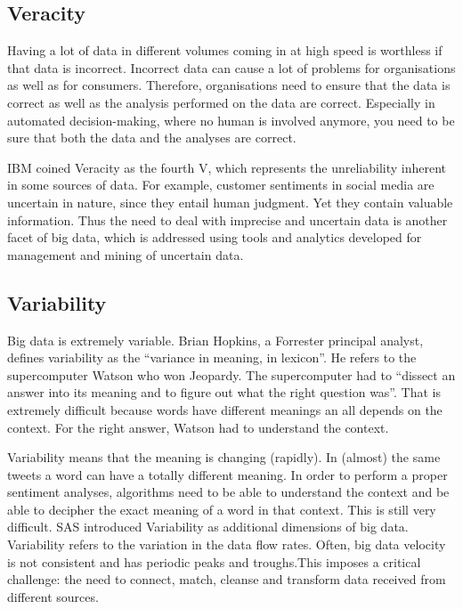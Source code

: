 \subsection{Veracity}
Having a lot of data in different volumes coming in at high speed is worthless if that data is incorrect. Incorrect data can cause a lot of problems for organisations as well as for consumers. Therefore, organisations need to ensure that the data is correct as well as the analysis performed on the data are correct. Especially in automated decision-making, where no human is involved anymore, you need to be sure that both the data and the analyses are correct.
\par
IBM coined Veracity as the fourth V, which represents the unreliability inherent in some sources of data. For example, customer sentiments in social media are uncertain in nature, since they entail human judgment. Yet they contain valuable information. Thus the need to deal with imprecise and uncertain data is another facet of big data, which is addressed using tools and analytics developed for management and mining of uncertain data.
\subsection{Variability}
Big data is extremely variable. Brian Hopkins, a Forrester principal analyst, defines variability as the “variance in meaning, in lexicon”. He refers to the supercomputer Watson who won Jeopardy. The supercomputer had to “dissect an answer into its meaning and to figure out what the right question was”. That is extremely difficult because words have different meanings an all depends on the context. For the right answer, Watson had to understand the context.
\par
Variability means that the meaning is changing (rapidly). In (almost) the same tweets a word can have a totally different meaning. In order to perform a proper sentiment analyses, algorithms need to be able to understand the context and be able to decipher the exact meaning of a word in that context. This is still very difficult. SAS introduced Variability as additional dimensions of big data. Variability refers to the variation in the data flow rates. Often, big data velocity is not consistent and has periodic peaks and troughs.This imposes a critical challenge: the need to connect, match, cleanse and transform data received from different sources.
